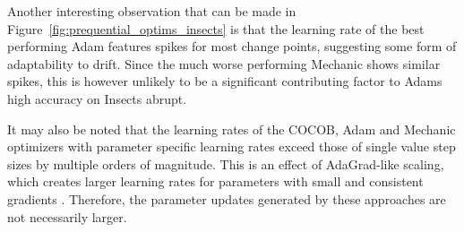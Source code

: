 \documentclass[letterpaper]{article} %
\begin{document}
Another interesting observation that can be made in Figure~\ref{fig:prequential_optims_insects} is that the learning rate of the best performing Adam features spikes for most change points, suggesting some form of adaptability to drift.
Since the much worse performing Mechanic shows similar spikes, this is however unlikely to be a significant contributing factor to Adams high accuracy on Insects abrupt.

It may also be noted that the learning rates of the COCOB, Adam and Mechanic optimizers with parameter specific learning rates exceed those of single value step sizes by multiple orders of magnitude.
This is an effect of AdaGrad-like scaling, which creates larger learning rates for parameters with small and consistent gradients \cite{cutkoskyMechanicLearningRate2023}.
Therefore, the parameter updates generated by these approaches are not necessarily larger.
\end{document}
